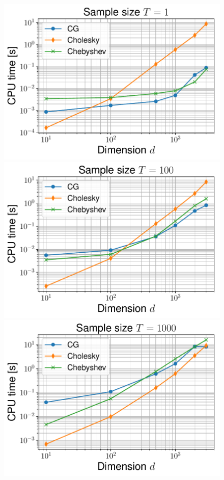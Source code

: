 \documentclass[nohypdvips,onefignum,onetabnum]{siamart171218}
\begin{document}
\begin{figure}
  \centering
  \mbox{{\includegraphics[scale=0.4]{images/simu1_ex1_time_1.pdf}}}
  \mbox{{\includegraphics[scale=0.4]{images/simu1_ex1_time_100.pdf}}}
  \mbox{{\includegraphics[scale=0.4]{images/simu1_ex1_time_1000.pdf}}}

\end{figure}
\end{document}
